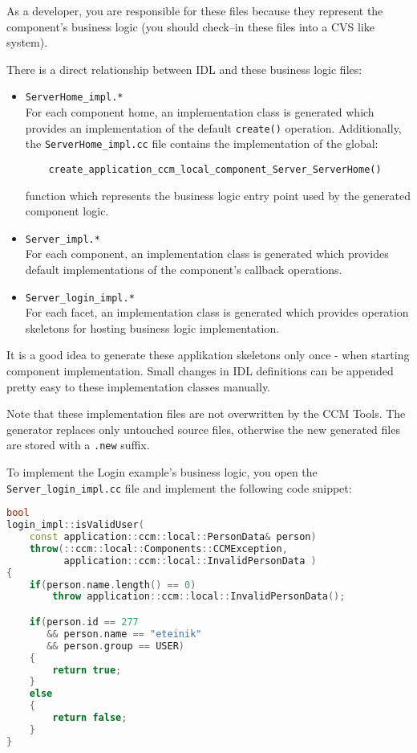 As a developer, you are responsible for these files because they represent the
component's business logic (you should check--in these files into a CVS like system).

\vspace{3mm}
There is a direct relationship between IDL and these business logic files:
\begin{itemize}
	\item {\tt ServerHome\_impl.*}\\
	For each component home, an implementation class is generated which provides an
	implementation of the default {\tt create()} operation.
	Additionally, the {\tt ServerHome\_impl.cc} file contains the implementation of
	the global:
	\begin{verbatim}
    create_application_ccm_local_component_Server_ServerHome()
    \end{verbatim}
 	function which represents the business logic entry point used by the generated 
 	component logic. 

\item {\tt Server\_impl.*}\\
	For each component, an implementation class is generated which provides 
	default implementations of the component's callback operations.
	
\item {\tt Server\_login\_impl.*}\\
	For each facet, an implementation class is generated which provides operation
	skeletons for hosting business logic implementation.
\end{itemize}

It is a good idea to generate these applikation skeletons only once - when starting 
component implementation. 
Small changes in IDL definitions can be appended pretty easy to these
implementation classes manually.

 \vspace{3mm}
Note that these implementation files are not overwritten by the CCM Tools.
The generator replaces only untouched source files, otherwise the new
generated files are stored with a {\tt .new} suffix.

 \vspace{3mm}
To implement the Login example's business logic, you open the 
{\tt Server\_login\_impl.cc} file and implement the following code snippet:

\begin{footnotesize}
\begin{lstlisting}[language=C++]
bool
login_impl::isValidUser(
    const application::ccm::local::PersonData& person)
    throw(::ccm::local::Components::CCMException,
          application::ccm::local::InvalidPersonData )
{
    if(person.name.length() == 0)
        throw application::ccm::local::InvalidPersonData();

    if(person.id == 277 
       && person.name == "eteinik"
       && person.group == USER) 
    {
        return true;
    }
    else 
    {
        return false;
    }
}
\end{lstlisting}
\end{footnotesize}

